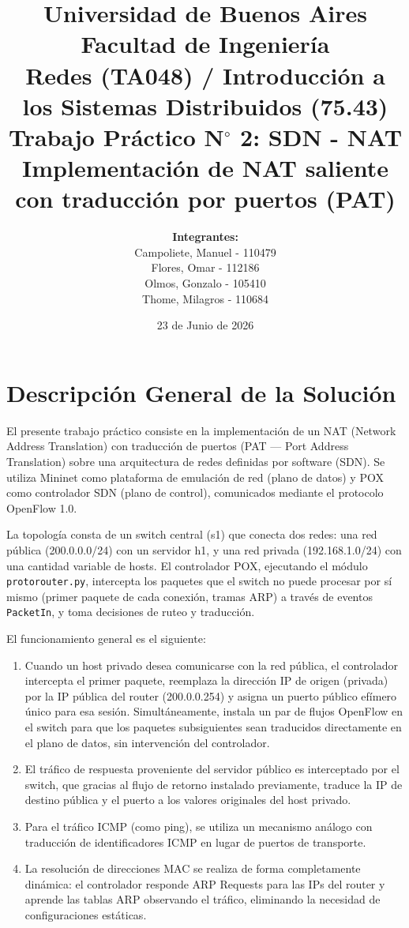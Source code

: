 \documentclass[11pt, a4paper]{article}
\title{
    \normalsize Universidad de Buenos Aires \\
    \normalsize Facultad de Ingeniería \\
    \normalsize Redes (TA048) / Introducción a los Sistemas Distribuidos (75.43) \\ [2cm]
    \Large \textbf{Trabajo Práctico N$^{\circ}$ 2: SDN - NAT} \\
    \large Implementación de NAT saliente con traducción por puertos (PAT) \\ [1cm]
}
\author{
    \textbf{Integrantes:} \\
    Campoliete, Manuel - 110479 \\
    Flores, Omar - 112186 \\
    Olmos, Gonzalo - 105410 \\
    Thome, Milagros - 110684 \\
    [2cm]
}
\date{23 de Junio de 2026} %
\begin{document}
\maketitle
\thispagestyle{empty}
\clearpage
\tableofcontents
\clearpage

\section{Descripción General de la Solución}
\label{sec:descripcion_general}

El presente trabajo práctico consiste en la implementación de un NAT (Network Address Translation) con traducción de puertos (PAT --- Port Address Translation) sobre una arquitectura de redes definidas por software (SDN). Se utiliza Mininet como plataforma de emulación de red (plano de datos) y POX como controlador SDN (plano de control), comunicados mediante el protocolo OpenFlow 1.0.

La topología consta de un switch central (s1) que conecta dos redes: una red pública (200.0.0.0/24) con un servidor h1, y una red privada (192.168.1.0/24) con una cantidad variable de hosts. El controlador POX, ejecutando el módulo \texttt{protorouter.py}, intercepta los paquetes que el switch no puede procesar por sí mismo (primer paquete de cada conexión, tramas ARP) a través de eventos \texttt{PacketIn}, y toma decisiones de ruteo y traducción.

El funcionamiento general es el siguiente:

\begin{enumerate}
    \item Cuando un host privado desea comunicarse con la red pública, el controlador intercepta el primer paquete, reemplaza la dirección IP de origen (privada) por la IP pública del router (200.0.0.254) y asigna un puerto público efímero único para esa sesión. Simultáneamente, instala un par de flujos OpenFlow en el switch para que los paquetes subsiguientes sean traducidos directamente en el plano de datos, sin intervención del controlador.
    \item El tráfico de respuesta proveniente del servidor público es interceptado por el switch, que gracias al flujo de retorno instalado previamente, traduce la IP de destino pública y el puerto a los valores originales del host privado.
    \item Para el tráfico ICMP (como ping), se utiliza un mecanismo análogo con traducción de identificadores ICMP en lugar de puertos de transporte.
    \item La resolución de direcciones MAC se realiza de forma completamente dinámica: el controlador responde ARP Requests para las IPs del router y aprende las tablas ARP observando el tráfico, eliminando la necesidad de configuraciones estáticas.
\end{enumerate}
\end{document}
